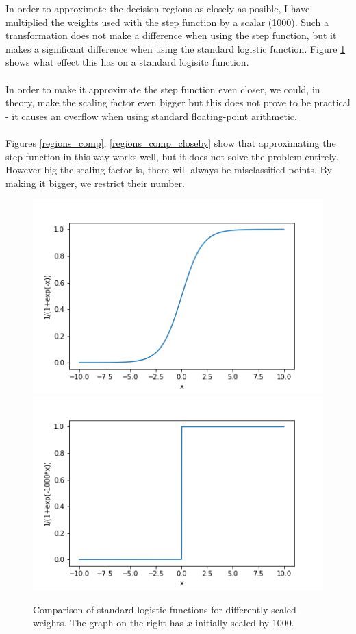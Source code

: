 \documentclass[12pt]{article}
\begin{document}
\newpage
\noindent
In order to approximate the decision regions as closely as posible, I have multiplied the weights used with the step function by a scalar (1000). Such a transformation does not make a difference when using the step function, but it makes a significant difference when using the standard logistic function. Figure \ref{sigmos} shows what effect this has on a standard logisitc function. \\\\In order to make it approximate the step function even closer, we could, in theory, make the scaling factor even bigger but this does not prove to be practical
- it causes an overflow when using standard floating-point arithmetic.\\\\
Figures \ref{regions_comp}, \ref{regions_comp_closeby} show that approximating the step function in this way works well, but it does not solve the problem entirely. However big the scaling factor is, there will always be misclassified points. By making it bigger, we restrict their number.

\begin{figure}[!htb]
\includegraphics[scale=0.6]{sigmo_first.png}
\vspace{0cm}
\hspace{-1cm}
\includegraphics[scale=0.6]{sigmo_second.png}
\caption{Comparison of standard logistic functions for differently scaled weights. The graph on the right has $x$ initially scaled by 1000.}
\label{sigmos}
\end{figure}
\end{document}
